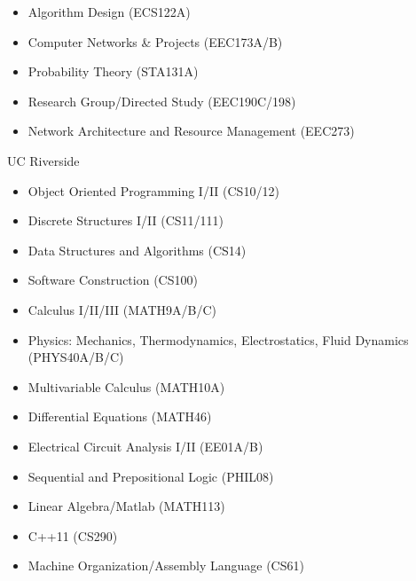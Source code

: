 \begin{cvcourses}
{\begin{multicols}{3}
\begin{itemize}
          \item Algorithm Design (ECS122A)
          \item Computer Networks \& Projects (EEC173A/B)
          \item Probability Theory (STA131A)
          \item Research Group/Directed Study (EEC190C/198)
          \item Network Architecture and Resource Management (EEC273)
        \end{itemize}
      \end{multicols}
    }
  \cvcourselist
    {UC Riverside} %
    {
      \begin{multicols}{3}
        \begin{itemize}
          \item Object Oriented Programming I/II (CS10/12)
          \item Discrete Structures I/II (CS11/111)
          \item Data Structures and Algorithms (CS14)
          \item Software Construction (CS100)
          \item Calculus I/II/III (MATH9A/B/C)
          \item Physics: Mechanics, Thermodynamics, Electrostatics, Fluid Dynamics (PHYS40A/B/C)
          \item Multivariable Calculus (MATH10A)
          \item Differential Equations (MATH46)
          \item Electrical Circuit Analysis I/II (EE01A/B)
          \item Sequential and Prepositional Logic (PHIL08)
          \item Linear Algebra/Matlab (MATH113)
          \item C++11 (CS290)
          \item Machine Organization/Assembly Language (CS61)
        \end{itemize}
      \end{multicols}
    }
\end{cvcourses}
